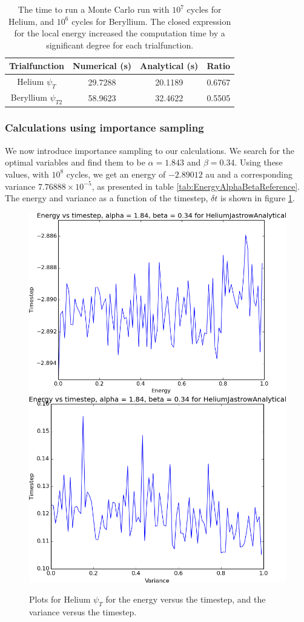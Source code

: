 			\begin{table}
				\center
				\begin{tabular}{| c | c | c | c |}
				    \hline
				   	\textbf{Trialfunction} & Numerical (s) & Analytical (s) & Ratio
				    \\ \hline
				    Helium $\psi_{T}$ & 29.7288 & 20.1189	& 0.6767
				    \\	\hline
				    Beryllium $\psi_{T2}$ & 58.9623  &	32.4622 & 0.5505
					    \\ \hline
				\end{tabular}
				\caption{The time to run a Monte Carlo run with \(10^7\) cycles for Helium, and \(10^6\) cycles for Beryllium. The closed expression for the local energy increased the computation time by a significant degree for each trialfunction. }
				\label{tab:analyticVSNumeric}
			\end{table}

		\subsubsection{Calculations using importance sampling}
			We now introduce importance sampling to our calculations. We search for the optimal variables and find them to be $\alpha=1.843$ and $\beta=0.34$. Using these values, with $10^{8}$ cycles, we get an energy of $-2.89012$ au and a corresponding variance $7.76888\times10^{-5}$, as presented in table \ref{tab:EnergyAlphaBetaReference}. The energy and variance as a function of the timestep, $\delta t$ is shown in figure \ref{fig:HeliumTimestep}.

			\begin{figure}
				\centering \includegraphics[width=0.45\linewidth]{../figures/HeliumJastrowAnalyticalTimeEnergy}
				\includegraphics[width=0.45\linewidth]{../figures/HeliumJastrowAnalyticalTimeVariance}
				\protect\caption{Plots for Helium $\psi_{T}$ for the energy versus the timestep, and the variance versus the timestep.}
				\label{fig:HeliumTimestep}
			\end{figure}

